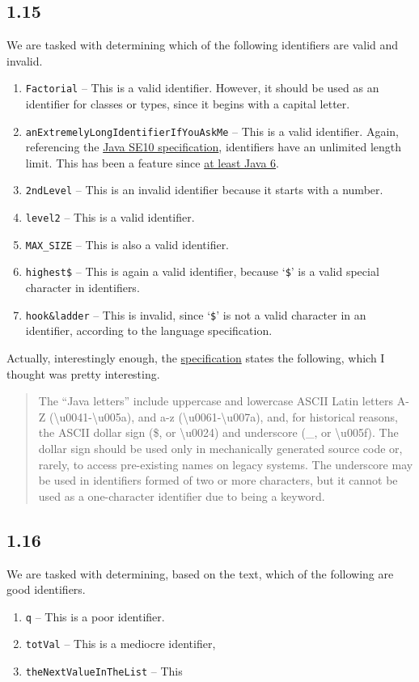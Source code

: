 \documentclass[leqno, 11pt]{article}
\begin{document}
\subsection*{1.15}
We are tasked with determining which of the following identifiers are valid and invalid.
\begin{enumerate}
  \item \texttt{Factorial} -- This is a valid identifier. However, it should be used as an identifier for classes or types, since it begins with a capital letter.
  \item \texttt{anExtremelyLongIdentifierIfYouAskMe} -- This is a valid identifier. Again, referencing the \href{https://docs.oracle.com/javase/specs/jls/se10/html/jls-3.html#jls-3.8}{Java SE10 specification}, identifiers have an unlimited length limit. This has been a feature since \href{https://docs.oracle.com/javase/specs/jls/se6/html/lexical.html#3.8}{at least Java 6}.
  \item \texttt{2ndLevel} -- This is an invalid identifier because it starts with a number.
  \item \texttt{level2} -- This is a valid identifier.
  \item \texttt{MAX\_SIZE} -- This is also a valid identifier.
  \item \texttt{highest\$} -- This is again a valid identifier, because `\texttt{\$}' is a valid special character in identifiers.
  \item \texttt{hook\&ladder} -- This is invalid, since `\texttt{\$}' is not a valid character in an identifier, according to the language specification.
\end{enumerate}
Actually, interestingly enough, the \href{https://docs.oracle.com/javase/specs/jls/se10/html/jls-3.html#jls-3.8}{specification} states the following, which I thought was pretty interesting.
\begin{quote}
  The ``Java letters'' include uppercase and lowercase ASCII Latin letters A-Z (\textbackslash u0041-\textbackslash u005a), and a-z (\textbackslash u0061-\textbackslash u007a), and, for historical reasons, the ASCII dollar sign (\$, or \textbackslash u0024) and underscore (\_, or \textbackslash u005f). The dollar sign should be used only in mechanically generated source code or, rarely, to access pre-existing names on legacy systems. The underscore may be used in identifiers formed of two or more characters, but it cannot be used as a one-character identifier due to being a keyword.
\end{quote}
\subsection*{1.16}
We are tasked with determining, based on the text, which of the following are good identifiers.
\begin{enumerate}
  \item \texttt{q} -- This is a poor identifier.
  \item \texttt{totVal} -- This is a mediocre identifier, 
  \item \texttt{theNextValueInTheList} -- This 
\end{enumerate}
\end{document}
